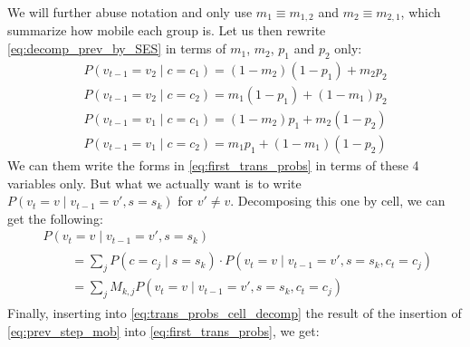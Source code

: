 \documentclass[../thesis.tex]{subfiles}
\begin{document}
We will further abuse notation and only use $m_1 \equiv
m_{1,2}$ and $m_2 \equiv m_{2, 1}$, which summarize how mobile each group is. Let us then rewrite
\eqref{eq:decomp_prev_by_SES} in terms of $m_1$, $m_2$, $p_1$ and $p_2$ only:
\begin{equation}
    \label{eq:prev_step_mob}
    \begin{aligned}
        P(v_{t-1} = v_2 \mid c = c_1)
            = (1 - m_2) (1 - p_1) + m_2 p_2
        \\
        P(v_{t-1} = v_2 \mid c = c_2)
            = m_1 (1 - p_1) + (1 - m_1) p_2
        \\
        P(v_{t-1} = v_1 \mid c = c_1)
            = (1 - m_2) p_1 + m_2 (1 - p_2)
        \\
        P(v_{t-1} = v_1 \mid c = c_2)
            = m_1 p_1 + (1 - m_1) (1 - p_2)
    \end{aligned}
\end{equation}
We can them write the forms in \eqref{eq:first_trans_probs} in terms of these 4
variables only. But what we actually want is to write $P(v_t = v \mid v_{t-1} = v', s
= s_k)$ for $v' \neq v$. Decomposing this one by cell, we can get the following:
\begin{equation}
    \label{eq:trans_probs_cell_decomp}
    \begin{aligned}
        & P(v_t = v \mid v_{t-1} = v', s = s_k)
        \\[1ex]
        &
        \begin{aligned}
            \quad & = \sum_j P(c = c_j \mid s = s_k)
            \cdot P(v_t = v \mid v_{t-1} = v', s = s_k, c_t = c_j)
        \\
            & = \sum_j M_{k, j} P(v_t = v \mid v_{t-1} = v', s = s_k, c_t = c_j)
        \end{aligned}
    \end{aligned}
\end{equation}
Finally, inserting into \eqref{eq:trans_probs_cell_decomp} the result of the insertion
of \eqref{eq:prev_step_mob} into \eqref{eq:first_trans_probs}, we get:
\end{document}
